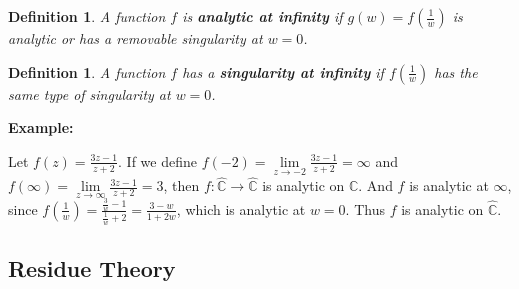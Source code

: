 \documentclass{article}
\theoremstyle{colontheorem}
\newtheorem{definition}[theorem]{Definition}
\newenvironment{Def}
{
	\begin{mdframed}[backgroundcolor=DefGreen!10]
	\begin{definition}
}
{
	\end{definition}
	\end{mdframed}
	
	\vspace{.15in}
}
\newenvironment{Example}
{
	\begin{mdframed}
	\textbf{Example:}%
}
{
	\end{mdframed}
	
	\vspace{.15in}
}
\begin{document}
\begin{Def}
	
	A function $f$ is \textbf{analytic at infinity} if $g(w) = f(\frac{1}{w})$ is analytic or has a removable singularity at $w = 0$.
	
\end{Def}



\begin{Def}
	
	A function $f$ has a \textbf{singularity at infinity} if $f(\frac{1}{w})$ has the same type of singularity at $w = 0$.
	
\end{Def}



\begin{Example}
	Let $f(z) = \frac{3z - 1}{z + 2}$. If we define $f(-2) = \lim\limits_{z \to -2} \frac{3z - 1}{z + 2} = \infty$ and $f(\infty) = \lim\limits_{z \to \infty} \frac{3z - 1}{z + 2} = 3$, then $f : \hat{\mathbb{C}} \longrightarrow \hat{\mathbb{C}}$ is analytic on $\mathbb{C}$. And $f$ is analytic at $\infty$, since $f(\frac{1}{w}) = \frac{\frac{3}{w} - 1}{\frac{1}{w} + 2} = \frac{3 - w}{1 + 2w}$, which is analytic at $w = 0$. Thus $f$ is analytic on $\hat{\mathbb{C}}$.
	
\end{Example}





\begin{center}
	\pagebreak
	
	\section{Residue Theory}
	
	\vspace{.1in}
\end{center}
\end{document}
